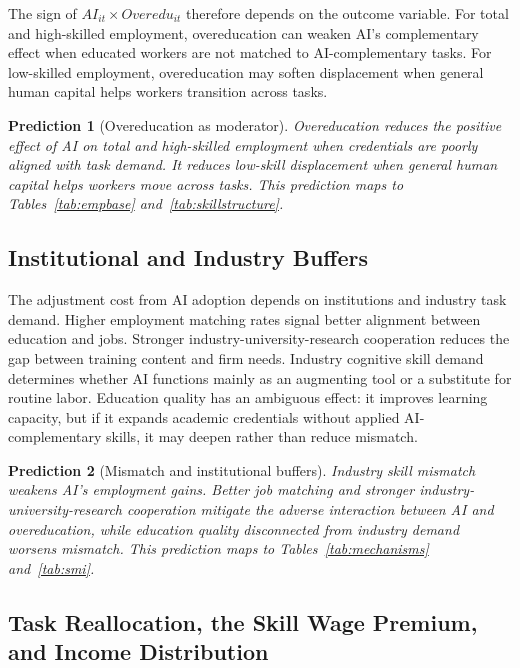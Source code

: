 \documentclass[12pt,a4paper]{article}
\theoremstyle{predstyle}
\newtheorem{prediction}{Prediction}
\theoremstyle{plain}
\newcommand{\Overedu}{\mathit{Overedu}}
\begin{document}
The sign of \(AI_{it} \times \Overedu_{it}\) therefore depends on the outcome variable. For total and high-skilled employment, overeducation can weaken AI's complementary effect when educated workers are not matched to AI-complementary tasks. For low-skilled employment, overeducation may soften displacement when general human capital helps workers transition across tasks.

\begin{prediction}[Overeducation as moderator]
\label{pred:overedu}
Overeducation reduces the positive effect of AI on total and high-skilled employment when credentials are poorly aligned with task demand. It reduces low-skill displacement when general human capital helps workers move across tasks. This prediction maps to Tables~\ref{tab:empbase} and~\ref{tab:skillstructure}.
\end{prediction}

\subsection{Institutional and Industry Buffers}

The adjustment cost from AI adoption depends on institutions and industry task demand. Higher employment matching rates signal better alignment between education and jobs. Stronger industry-university-research cooperation reduces the gap between training content and firm needs. Industry cognitive skill demand determines whether AI functions mainly as an augmenting tool or a substitute for routine labor. Education quality has an ambiguous effect: it improves learning capacity, but if it expands academic credentials without applied AI-complementary skills, it may deepen rather than reduce mismatch.

\begin{prediction}[Mismatch and institutional buffers]
\label{pred:buffers}
Industry skill mismatch weakens AI's employment gains. Better job matching and stronger industry-university-research cooperation mitigate the adverse interaction between AI and overeducation, while education quality disconnected from industry demand worsens mismatch. This prediction maps to Tables~\ref{tab:mechanisms} and~\ref{tab:smi}.
\end{prediction}

\subsection{Task Reallocation, the Skill Wage Premium, and Income Distribution}
\label{sec:wage_theory}
\end{document}
